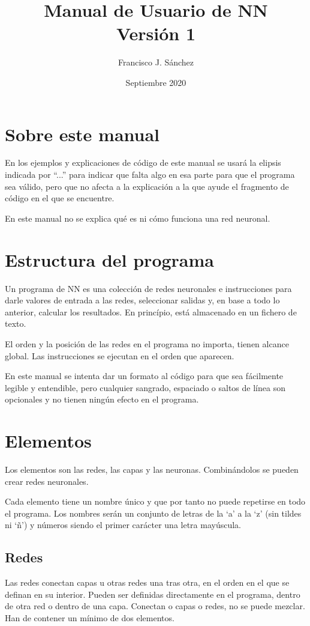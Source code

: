 \documentclass[a4paper]{article}
\title{Manual de Usuario de NN\\
\large Versión 1}
\author{Francisco J. Sánchez}
\date{Septiembre 2020}
\begin{document}
\maketitle

\tableofcontents

\section*{Sobre este manual}
En los ejemplos y explicaciones de código de este manual se usará la elipsis indicada por ``...'' para indicar que falta algo en esa parte para que el programa sea válido, pero que no afecta a la explicación a la que ayude el fragmento de código en el que se encuentre.

En este manual no se explica qué es ni cómo funciona una red neuronal.

\section{Estructura del programa}
Un programa de NN es una colección de redes neuronales e instrucciones para darle valores de entrada a las redes, seleccionar salidas y, en base a todo lo anterior, calcular los resultados. En princípio, está almacenado en un fichero de texto.

El orden y la posición de las redes en el programa no importa, tienen alcance global. Las instrucciones se ejecutan en el orden que aparecen.

En este manual se intenta dar un formato al código para que sea fácilmente legible y entendible, pero cualquier sangrado, espaciado o saltos de línea son opcionales y no tienen ningún efecto en el programa.

\section{Elementos}
Los elementos son las redes, las capas y las neuronas. Combinándolos se pueden crear redes neuronales.

Cada elemento tiene un nombre único y que por tanto no puede repetirse en todo el programa. Los nombres serán un conjunto de letras de la `a' a la `z' (sin tildes ni `ñ') y números siendo el primer carácter una letra mayúscula.\label{nombres}

\subsection{Redes}
Las redes conectan capas u otras redes una tras otra, en el orden en el que se definan en su interior. Pueden ser definidas directamente en el programa, dentro de otra red o dentro de una capa. Conectan o capas o redes, no se puede mezclar. Han de contener un mínimo de dos elementos.
\end{document}

